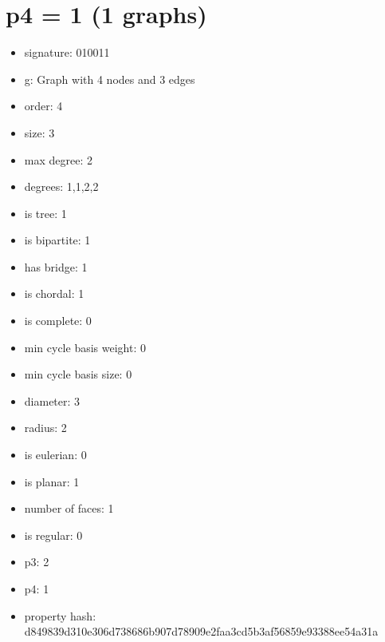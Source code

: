 \chapter{p4 = 1 (1 graphs)}
\newpage\begin{figure}
\end{figure}
\begin{itemize}
\item signature: 010011
\item g: Graph with 4 nodes and 3 edges
\item order: 4
\item size: 3
\item max degree: 2
\item degrees: 1,1,2,2
\item is tree: 1
\item is bipartite: 1
\item has bridge: 1
\item is chordal: 1
\item is complete: 0
\item min cycle basis weight: 0
\item min cycle basis size: 0
\item diameter: 3
\item radius: 2
\item is eulerian: 0
\item is planar: 1
\item number of faces: 1
\item is regular: 0
\item p3: 2
\item p4: 1
\item property hash: d849839d310e306d738686b907d78909e2faa3cd5b3af56859e93388ee54a31a
\end{itemize}
\newpage
